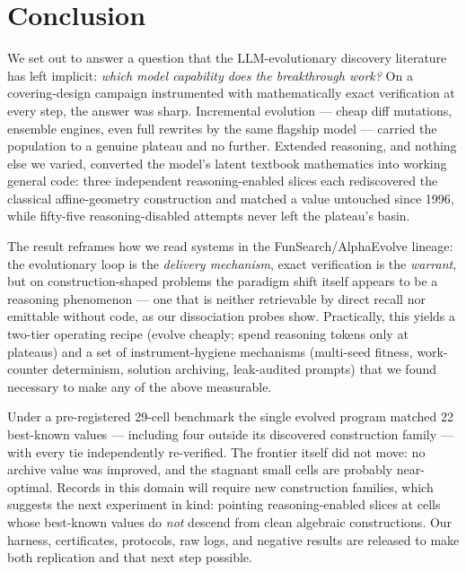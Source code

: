 \section{Conclusion}\label{sec:conclusion}

We set out to answer a question that the LLM-evolutionary discovery
literature has left implicit: \emph{which model capability does the
breakthrough work?} On a covering-design campaign instrumented with
mathematically exact verification at every step, the answer was
sharp. Incremental evolution --- cheap diff mutations, ensemble
engines, even full rewrites by the same flagship model --- carried
the population to a genuine plateau and no further. Extended
reasoning, and nothing else we varied, converted the model's latent
textbook mathematics into working general code: three independent
reasoning-enabled slices each rediscovered the classical
affine-geometry construction and matched a value untouched since
1996, while fifty-five reasoning-disabled attempts never left the
plateau's basin.

The result reframes how we read systems in the FunSearch/AlphaEvolve
lineage: the evolutionary loop is the \emph{delivery mechanism},
exact verification is the \emph{warrant}, but on construction-shaped
problems the paradigm shift itself appears to be a reasoning
phenomenon --- one that is neither retrievable by direct recall nor
emittable without code, as our dissociation probes show. Practically,
this yields a two-tier operating recipe (evolve cheaply; spend
reasoning tokens only at plateaus) and a set of instrument-hygiene
mechanisms (multi-seed fitness, work-counter determinism, solution
archiving, leak-audited prompts) that we found necessary to make any
of the above measurable.

Under a pre-registered 29-cell benchmark the single evolved program
matched 22 best-known values --- including four outside its
discovered construction family --- with every tie independently
re-verified. The frontier itself did not move: no archive value was
improved, and the stagnant small cells are probably near-optimal.
Records in this domain will require new construction families, which
suggests the next experiment in kind: pointing reasoning-enabled
slices at cells whose best-known values do \emph{not} descend from
clean algebraic constructions. Our harness, certificates, protocols,
raw logs, and negative results are released to make both replication
and that next step possible.
